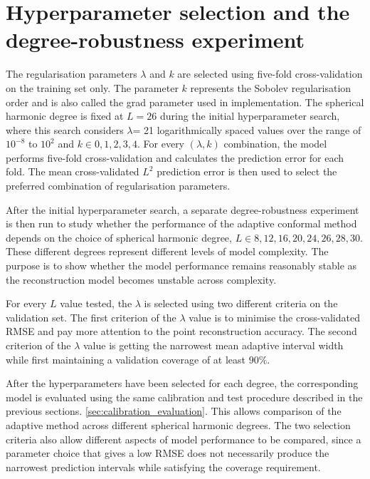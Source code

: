 \documentclass[11pt,a4paper]{report}
\begin{document}
\section{Hyperparameter selection and the degree-robustness experiment}
\label{sec:hyperparam-degree}

The regularisation parameters $\lambda$ and $k$ are selected using five-fold cross-validation on the training set only. The parameter $k$ represents the Sobolev regularisation order and is also called the grad parameter used in implementation. The spherical harmonic degree is fixed at $L=26$ during the initial hyperparameter search, where this search considers $\lambda$= 21 logarithmically spaced values over the range of $10^{-8}$ to $10^{2}$ and $k\in{0,1,2,3,4}$. For every $(\lambda,k)$ combination, the model performs five-fold cross-validation and calculates the prediction error for each fold. The mean cross-validated $L^2$ prediction error is then used to select the preferred combination of regularisation parameters.
 
After the initial hyperparameter search, a separate degree-robustness experiment is then run to study whether the performance of the adaptive conformal method depends on the choice of spherical harmonic degree, $L\in{8,12,16,20,24,26,28,30}$. These different degrees represent different levels of model complexity. The purpose is to show whether the model performance remains reasonably stable as the reconstruction model becomes unstable across complexity.

For every $L$ value tested, the $\lambda$ is selected using two different criteria on the validation set. The first criterion of the $\lambda$ value is to minimise the cross-validated RMSE and pay more attention to the point reconstruction accuracy. The second criterion of the $\lambda$ value is getting the narrowest mean adaptive interval width while first maintaining a validation coverage of at least $90\%$. 

After the hyperparameters have been selected for each degree, the corresponding model is evaluated using the same calibration and test procedure described in the previous sections. \cref{sec:calibration_evaluation}. This allows comparison of the adaptive method across different spherical harmonic degrees. The two selection criteria also allow different aspects of model performance to be compared, since a parameter choice that gives a low RMSE does not necessarily produce the narrowest prediction intervals while satisfying the coverage requirement. 
\end{document}
